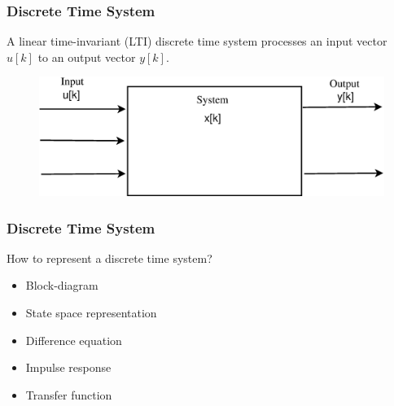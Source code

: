 \begin{frame}
	\frametitle{Discrete Time System}
	\begin{definition}
			A linear time-invariant (LTI) discrete time system processes an input vector $u[k]$ to an output vector $y[k]$.\\
	\end{definition}
		\begin{example}
			\begin{figure}
				\centering
				\includegraphics[width=0.7\linewidth]{Images/Discrete_time_eps_2.eps}
			\end{figure}
		\end{example}
\end{frame}
\begin{frame}
	\frametitle{Discrete Time System}
	\begin{block}{How to represent a discrete time system?}
		\begin{itemize}
			\item Block-diagram
			\item State space representation
			\item Difference equation
			\item Impulse response
			\item Transfer function
		\end{itemize}
	\end{block}
	

\end{frame}
